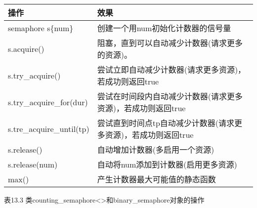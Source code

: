 \begin{longtable}[c]{|l|l|}
\hline
\textbf{操作} & \textbf{效果}                                                                     \\ \hline
\endfirsthead
%
\endhead
%
semaphore s\{num\} & 创建一个用num初始化计数器的信号量                           \\ \hline
s.acquire()        & 阻塞，直到可以自动减少计数器(请求更多的资源)。 \\ \hline
s.try\_acquire()          & 尝试立即自动减少计数器(请求更多资源)，若成功则返回true      \\ \hline
s.try\_acquire\_for(dur)  & 尝试在时间段内自动减少计数器(请求更多资源)，若成功则返回true   \\ \hline
s.tre\_acquire\_until(tp) & 尝试直到时间点tp自动减少计数器(请求更多资源)，若成功则返回true \\ \hline
s.release()        & 自动增加计数器(多启用一个资源)                      \\ \hline
s.release(num)     & 自动将num添加到计数器(启用更多资源)                     \\ \hline
max()              & 产生计数器最大可能值的静态函数               \\ \hline
\end{longtable}

\begin{center}
表13.3 类counting\_semaphore<>和binary\_semaphore对象的操作
\end{center}








